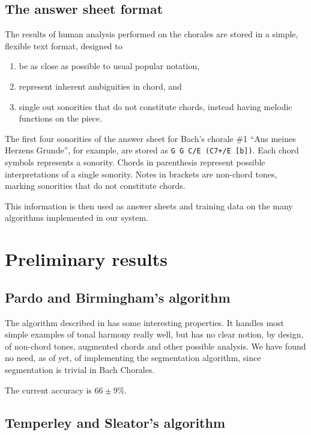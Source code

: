 \documentclass{article}
\begin{document}
\subsection{The answer sheet format}
\label{sec:formato-dos-acordes}

The results of human analysis performed on the chorales are stored in
a simple, flexible text format, designed to

\begin{enumerate}
\item be as close as possible to usual popular notation,
\item represent inherent ambiguities in chord, and
\item single out sonorities that do not constitute chords, instead
  having melodic functions on the piece.
\end{enumerate}

The first four sonorities of the answer sheet for Bach's chorale \#1
``Aus meines Herzens Grunde'', for example, are stored as \texttt{G G
  C/E (C7+/E [b])}. Each chord symbols represents a sonority. Chords
in parenthesis represent possible interpretations of a single
sonority. Notes in brackets are non-chord tones, marking sonorities
that do not constitute chords.

This information is then used as answer sheets and training data on the
many algorithms implemented in our system.

\section{Preliminary results}
\label{sec:analysis-results}

\subsection{Pardo and Birmingham's algorithm}
\label{sec:pardo-birmingham}

The algorithm described in \cite{pardo.ea:automated} has some
interesting properties. It handles most simple examples of tonal
harmony really well, but has no clear notion, by design, of non-chord
tones, augmented chords and other possible analysis. We
have found no need, as of yet, of implementing the segmentation
algorithm, since segmentation is trivial in Bach Chorales.

The current accuracy is $66 \pm 9\%$.

\subsection{Temperley and Sleator's algorithm}
\label{sec:temperley}
\end{document}
